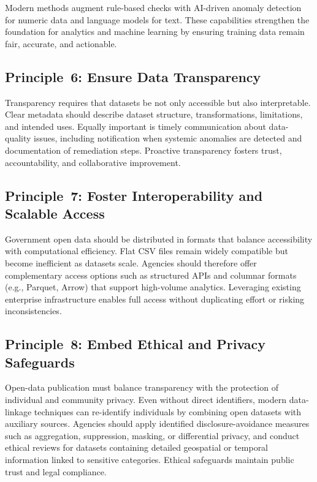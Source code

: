 \documentclass[linenumber]{jdsart}
\begin{document}
Modern methods augment rule-based checks with AI-driven anomaly detection for
numeric data and language models for text. These capabilities strengthen the
foundation for analytics and machine learning by ensuring training data remain
fair, accurate, and actionable.

\subsection{Principle~6: Ensure Data Transparency}
\label{subsec:principle6}

Transparency requires that datasets be not only accessible but also
interpretable. Clear metadata should describe dataset structure,
transformations, limitations, and intended uses. Equally important is timely
communication about data-quality issues, including notification when systemic
anomalies are detected and documentation of remediation steps. Proactive
transparency fosters trust, accountability, and collaborative improvement.

\subsection{Principle~7: Foster Interoperability and Scalable Access}
\label{subsec:principle7}

Government open data should be distributed in formats that balance
accessibility with computational efficiency. Flat CSV files remain
widely compatible but become inefficient as datasets scale. Agencies should
therefore offer complementary access options such as structured APIs and
columnar formats (e.g., Parquet, Arrow) that support high-volume analytics.
Leveraging existing enterprise infrastructure enables full access without
duplicating effort or risking inconsistencies.

\subsection{Principle~8: Embed Ethical and Privacy Safeguards}
\label{subsec:principle8}

Open-data publication must balance transparency with the protection of
individual and community privacy. Even without direct identifiers, modern
data-linkage techniques can re-identify individuals by combining open datasets
with auxiliary sources. Agencies should apply identified disclosure-avoidance measures
such as aggregation, suppression, masking, or differential privacy, and conduct
ethical reviews for datasets containing detailed geospatial or temporal
information linked to sensitive categories. Ethical safeguards maintain public
trust and legal compliance.
\end{document}
